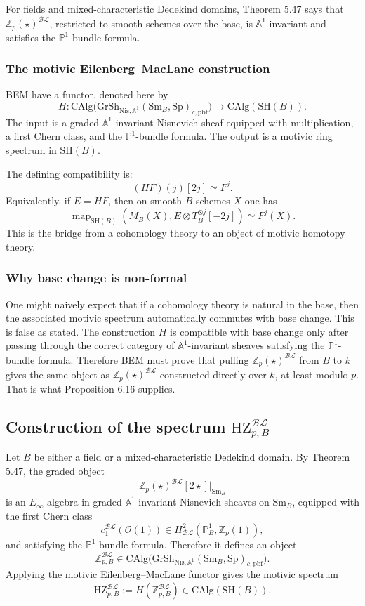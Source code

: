 \documentclass[11pt,a4paper]{article}
\newcommand{\Z}{\mathbb Z}
\newcommand{\Pone}{\mathbb P^1}
\newcommand{\Aone}{\mathbb A^1}
\newcommand{\Sp}{\mathrm{Sp}}
\newcommand{\SH}{\mathrm{SH}}
\newcommand{\Sm}{\mathrm{Sm}}
\newcommand{\CAlg}{\mathrm{CAlg}}
\newcommand{\Gr}{\mathrm{Gr}}
\newcommand{\Sh}{\mathrm{Sh}}
\newcommand{\Nis}{\mathrm{Nis}}
\newcommand{\BL}{\mathcal{BL}}
\newcommand{\pbf}{\mathrm{pbf}}
\newcommand{\HZ}{\mathrm{HZ}}
\newcommand{\1}{\mathbf 1}
\newcommand{\cBL}{c^{\BL}_{1}}
\theoremstyle{bemstyle}
\theoremstyle{definition}
\begin{document}
For fields and mixed-characteristic Dedekind domains, Theorem 5.47 says that \(\Z_p(\star)^{\BL}\), restricted to smooth schemes over the base, is \(\Aone\)-invariant and satisfies the \(\Pone\)-bundle formula. 

\subsubsection{The motivic Eilenberg--MacLane construction}

BEM have a functor, denoted here by
\[
  H:\CAlg\bigl(\Gr\Sh_{\Nis,\Aone}(\Sm_B,\Sp)_{c,\pbf}\bigr)
  \longrightarrow \CAlg(\SH(B)).
\]
The input is a graded \(\Aone\)-invariant Nisnevich sheaf equipped with multiplication, a first Chern class, and the \(\Pone\)-bundle formula. The output is a motivic ring spectrum in \(\SH(B)\).

The defining compatibility is:
\[
  (HF)(j)[2j]\simeq F^j.
\]
Equivalently, if \(E=HF\), then on smooth \(B\)-schemes \(X\) one has
\[
  \operatorname{map}_{\SH(B)}(M_B(X),E\otimes T_B^{\otimes j}[-2j])\simeq F^j(X).
\]
This is the bridge from a cohomology theory to an object of motivic homotopy theory.

\subsubsection{Why base change is non-formal}

One might naively expect that if a cohomology theory is natural in the base, then the associated motivic spectrum automatically commutes with base change. This is false as stated. The construction \(H\) is compatible with base change only after passing through the correct category of \(\Aone\)-invariant sheaves satisfying the \(\Pone\)-bundle formula. Therefore BEM must prove that pulling \(\Z_p(\star)^{\BL}\) from \(B\) to \(k\) gives the same object as \(\Z_p(\star)^{\BL}\) constructed directly over \(k\), at least modulo \(p\). That is what Proposition 6.16 supplies.

\subsection{Construction of the spectrum \texorpdfstring{\(\HZ^{\BL}_{p,B}\)}{HZ BL p,B}}

Let \(B\) be either a field or a mixed-characteristic Dedekind domain. By Theorem 5.47, the graded object
\[
  \Z_p(\star)^{\BL}[2\star]\big|_{\Sm_B}
\]
is an \(E_\infty\)-algebra in graded \(\Aone\)-invariant Nisnevich sheaves on \(\Sm_B\), equipped with the first Chern class
\[
  \cBL(\mathcal O(1))\in H^2_{\BL}(\Pone_B,\Z_p(1)),
\]
and satisfying the \(\Pone\)-bundle formula. Therefore it defines an object
\[
  \Z^{\BL}_{p,B}\in
  \CAlg\bigl(\Gr\Sh_{\Nis,\Aone}(\Sm_B,\Sp)_{c,\pbf}\bigr).
\]
Applying the motivic Eilenberg--MacLane functor gives the motivic spectrum
\[
  \HZ^{\BL}_{p,B}:=H(\Z^{\BL}_{p,B})\in\CAlg(\SH(B)).
\]
\end{document}
